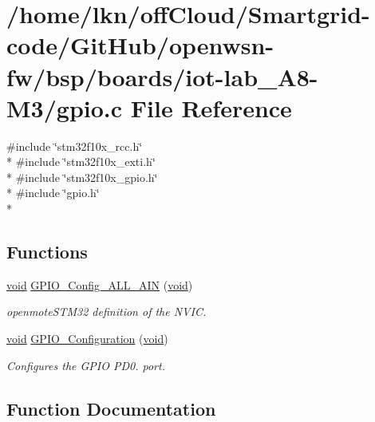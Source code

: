\hypertarget{iot-lab___a8-_m3_2gpio_8c}{}\section{/home/lkn/off\+Cloud/\+Smartgrid-\/code/\+Git\+Hub/openwsn-\/fw/bsp/boards/iot-\/lab\+\_\+\+A8-\/\+M3/gpio.c File Reference}
\label{iot-lab___a8-_m3_2gpio_8c}
{\ttfamily \#include \char`\"{}stm32f10x\+\_\+rcc.\+h\char`\"{}}\\*
{\ttfamily \#include \char`\"{}stm32f10x\+\_\+exti.\+h\char`\"{}}\\*
{\ttfamily \#include \char`\"{}stm32f10x\+\_\+gpio.\+h\char`\"{}}\\*
{\ttfamily \#include \char`\"{}gpio.\+h\char`\"{}}\\*
\subsection*{Functions}
\begin{DoxyCompactItemize}
\item 
\hyperlink{usb__devapi_8h_afabf60e7f57651d6d595a02c75f07cd0}{void} \hyperlink{iot-lab___a8-_m3_2gpio_8c_a500f1fb0e1c3dc284d55c05a168f8e85}{G\+P\+I\+O\+\_\+\+Config\+\_\+\+A\+L\+L\+\_\+\+A\+IN} (\hyperlink{usb__devapi_8h_afabf60e7f57651d6d595a02c75f07cd0}{void})
\begin{DoxyCompactList}\small\item\em openmote\+S\+T\+M32 definition of the N\+V\+IC. \end{DoxyCompactList}\item 
\hyperlink{usb__devapi_8h_afabf60e7f57651d6d595a02c75f07cd0}{void} \hyperlink{iot-lab___a8-_m3_2gpio_8c_a51c4d8e68afb4f1ab35691a25a46c20f}{G\+P\+I\+O\+\_\+\+Configuration} (\hyperlink{usb__devapi_8h_afabf60e7f57651d6d595a02c75f07cd0}{void})
\begin{DoxyCompactList}\small\item\em Configures the G\+P\+IO P\+D0. port. \end{DoxyCompactList}\end{DoxyCompactItemize}


\subsection{Function Documentation}
